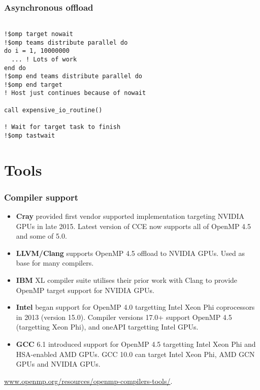 \documentclass[aspectratio=169]{beamer}
\begin{document}
\begin{frame}[fragile]
\frametitle{Asynchronous offload}
\begin{verbatim}

!$omp target nowait
!$omp teams distribute parallel do
do i = 1, 10000000
  ... ! Lots of work
end do
!$omp end teams distribute parallel do
!$omp end target
! Host just continues because of nowait

call expensive_io_routine()

! Wait for target task to finish
!$omp tastwait

\end{verbatim}
\end{frame}

\section{Tools}
\begin{frame}
\frametitle{Compiler support}
\begin{itemize}
  \item {\bf Cray} provided first vendor supported implementation targeting NVIDIA GPUs in late 2015. Latest version of CCE now supports all of OpenMP 4.5 and some of 5.0.
  \item {\bf LLVM/Clang} supports OpenMP 4.5 offload to NVIDIA GPUs. Used as base for many compilers.
  \item {\bf IBM} XL compiler suite utilises their prior work with Clang to provide OpenMP target support for NVIDIA GPUs.
  \item {\bf Intel} began support for OpenMP 4.0 targetting Intel Xeon Phi coprocessors in 2013 (version 15.0). Compiler versions 17.0+ support OpenMP 4.5 (targetting Xeon Phi), and oneAPI targetting Intel GPUs.
  \item {\bf GCC} 6.1 introduced support for OpenMP 4.5 targetting Intel Xeon Phi and HSA-enabled AMD GPUs. GCC 10.0 can target Intel Xeon Phi, AMD GCN GPUs and NVIDIA GPUs.
\end{itemize}

\url{www.openmp.org/resources/openmp-compilers-tools/}.

\end{frame}
\end{document}
